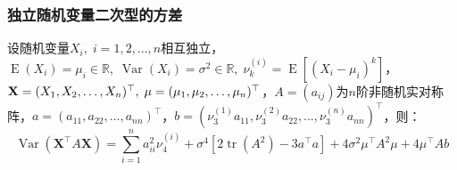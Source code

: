 \subsubsection{独立随机变量二次型的方差}
\begin{theorem}\label{theo:VRVQuadraticForm}
	设随机变量$X_i,\;i=1,2,\dots,n$相互独立，$\operatorname{E}(X_i)=\mu_i\in\mathbb{R},\;\operatorname{Var}(X_i)=\sigma^2\in\mathbb{R},\;\nu_k^{(i)}=\operatorname{E}[(X_i-\mu_i)^k]$，$\mathbf{X}=(X_1, X_2, \dots, X_{n})^{\top},\;\mu=(\mu_1, \mu_2, \dots, \mu_{n})^{\top}$，$A=(a_{ij})$为$n$阶非随机实对称阵，$a=(a_{11},a_{22},\dots,a_{nn})^{\top}$，$b=(\nu_3^{(1)}a_{11},\nu_3^{(2)}a_{22},\dots,\nu_3^{(n)}a_{nn})^{\top}$，则：
	\begin{equation*}
		\operatorname{Var}(\mathbf{X}^{\top}A\mathbf{X})=\sum_{i=1}^{n}a_{ii}^2\nu_4^{(i)}+\sigma^4[2\operatorname{tr}(A^2)-3a^{\top}a]+4\sigma^2\mu^{\top}A^2\mu+4\mu^{\top}Ab
	\end{equation*}
\end{theorem}
